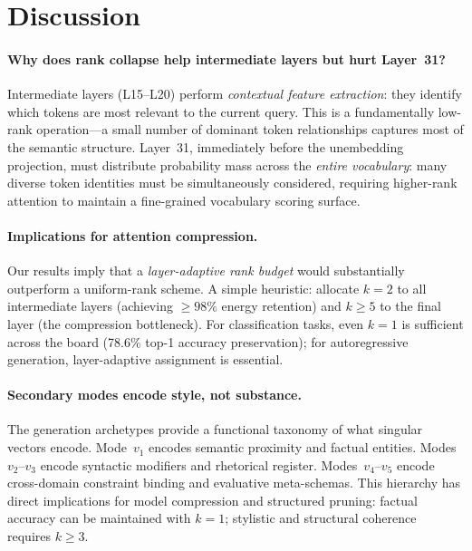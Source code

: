 \documentclass{article}
\begin{document}
\section{Discussion}
\label{sec:discussion}

\paragraph{Why does rank collapse help intermediate layers but hurt Layer~31?}
Intermediate layers (L15--L20) perform \emph{contextual feature extraction}:
they identify which tokens are most relevant to the current query.
This is a fundamentally low-rank operation---a small number of dominant token
relationships captures most of the semantic structure.
Layer~31, immediately before the unembedding projection, must distribute probability
mass across the \emph{entire vocabulary}: many diverse token identities must be
simultaneously considered, requiring higher-rank attention to maintain a
fine-grained vocabulary scoring surface.

\paragraph{Implications for attention compression.}
Our results imply that a \emph{layer-adaptive rank budget} would substantially
outperform a uniform-rank scheme.  A simple heuristic: allocate $k\!=\!2$ to all
intermediate layers (achieving $\geq\!98\%$ energy retention) and $k\!\geq\!5$ to
the final layer (the compression bottleneck).
For classification tasks, even $k\!=\!1$ is sufficient across the board
(78.6\% top-1 accuracy preservation); for autoregressive generation, layer-adaptive
assignment is essential.

\paragraph{Secondary modes encode style, not substance.}
The generation archetypes provide a functional taxonomy of what singular vectors
encode.  Mode~$v_1$ encodes semantic proximity and factual entities.
Modes~$v_2$--$v_3$ encode syntactic modifiers and rhetorical register.
Modes~$v_4$--$v_5$ encode cross-domain constraint binding and evaluative meta-schemas.
This hierarchy has direct implications for model compression
\citep{han2015compression} and structured pruning: factual accuracy can be maintained
with $k\!=\!1$; stylistic and structural coherence requires $k\geq 3$.
\end{document}
